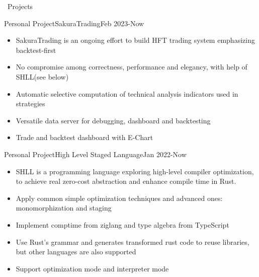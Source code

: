 \documentclass{resume}
\begin{document}
\begin{rSection}{\faUsers~Projects}
    \begin{rProject}{Personal Project}{SakuraTrading}{Feb 2023-Now}
        \begin{itemize}
            \itemsep -0.5em \vspace{-0.5em}
            \item SakuraTrading is an ongoing effort to build HFT trading system emphasizing backtest-first
            \item No compromise among correctness, performance and elegancy, with help of SHLL(see below)
            \item Automatic selective computation of technical analysis indicators used in strategies
            \item Versatile data server for debugging, dashboard and backtesting
            \item Trade and backtest dashboard with E-Chart
        \end{itemize}
    \end{rProject}
    \begin{rProject}{Personal Project}{High Level Staged Language}{Jan 2022-Now}
        \begin{itemize}
            \itemsep -0.5em \vspace{-0.5em}
            \item SHLL is a programming language exploring high-level compiler optimization, to achieve real zero-cost abstraction and enhance compile time in Rust.
            \item Apply common simple optimization techniques and advanced ones: monomorphization and staging
            \item Implement comptime from ziglang and type algebra from TypeScript
            \item Use Rust's grammar and generates transformed rust code to reuse libraries, but other languages are also supported
            \item Support optimization mode and interpreter mode
        \end{itemize}
    \end{rProject}
\end{rSection}
\end{document}

